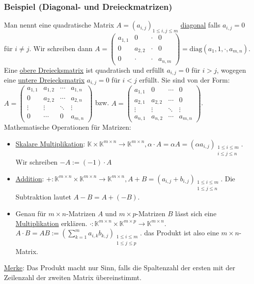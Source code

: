 \subsubsection{Beispiel (Diagonal- und Dreieckmatrizen)}
Man nennt eine quadratische Matrix $A=(a_{i,j})_{1\leq i,j\leq m}$ \underline{diagonal} falls $a_{i,j}=0$ für $i\not=j$.  Wir schreiben dann $A=\left(\begin{array}{cccc}a_{1,1} & 0 & \cdot & 0\\ 0 & a_{2,2} &\cdot & 0\\ 0 &\cdot &\cdot & a_{n,m}\end{array}\right)=\text{diag}(a_1,1,\cdot ,a_{m,n})$.  Eine \underline{obere Dreiecksmatrix} ist quadratisch und erfüllt $a_{i,j}=0$ für $i>j$, wogegen eine \underline{untere Dreiecksmatrix} $a_{i,j}=0$ für $i<j$ erfüllt.  Sie sind von der Form: $A=\left(\begin{array}{cccc}a_{1,1} & a_{1,2} & \cdots & a_{1,n}\\ 0 & a_{2,2} & \cdots & a_{2,n}\\ \vdots & \vdots & \ddots &\vdots \\ 0 & \cdots & 0 & a_{m,n}\end{array}\right)$ bzw. $A=\left(\begin{array}{cccc}a_{1,1} & 0 & \cdots & 0\\a_{2,1} & a_{2,2} & \cdots & 0 \\ \vdots & \vdots & \ddots &\vdots \\ a_{n,1} & a_{n,2}  &\cdots & a_{m,n}\end{array}\right)$.\\
Mathematische Operationen für Matrizen:
\begin{itemize}
\item \underline{Skalare Multiplikation}: $\mathbb{K}\times \mathbb{K}^{m\times n} \rightarrow \mathbb{K}^{m\times n}, \alpha \cdot A= \alpha A=(\alpha a_{i,j})_{\substack{1\leq i\leq m \\ i\leq j\leq n}}$.  Wir schreiben $-A:=(-1)\cdot A$
\item \underline{Addition}: $+:\mathbb{K}^{m\times n}\times \mathbb{K}^{m\times n} \rightarrow \mathbb{K}^{m\times n},A+B=(a_{i,j}+b_{i,j})_{\substack{1\leq i\leq m \\ 1\leq j\leq n}}$.  Die Subtraktion lautet $A-B=A+(-B)$.
\item Genau für $m\times n$-Matrizen $A$ und $m\times p$-Matrizen $B$ lässt sich eine \underline{Multiplikation} erklären.  $\cdot : \mathbb{K}^{m\times n}\times \mathbb{K}^{m\times p}\rightarrow \mathbb{K}^{m\times n}$.  $A\cdot B=AB:=(\sum^m_{k=1} a_{i,k}b_{k,j})_{\substack{1\leq i\leq m\\1\leq j\leq p}}$. das Produkt ist also eine $m\times n$-Matrix.
\end{itemize}
\underline{Merke}: Das Produkt macht nur Sinn, falls die Spaltenzahl der ersten mit der Zeilenzahl der zweiten Matrix übereinstimmt.
